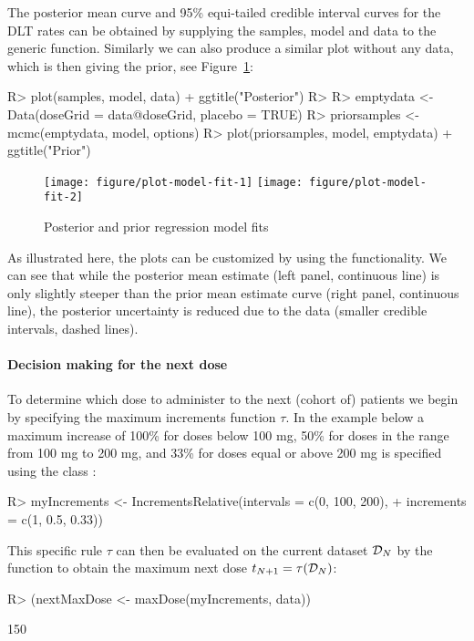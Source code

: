 \documentclass[article]{jss}\usepackage[]{graphicx}\usepackage[]{color}
\begin{document}
The posterior mean curve and 95\% equi-tailed credible interval curves for the 
DLT rates can be obtained by supplying
the samples, model and data to the generic  function. Similarly we can 
also produce a similar plot without any data, which is then giving the prior, see Figure~\ref{fig:plot-model-fit}:

\begin{Schunk}
\begin{Sinput}
R> plot(samples, model, data) + ggtitle("Posterior")
R> 
R> emptydata <- Data(doseGrid = data@doseGrid, placebo = TRUE)
R> priorsamples <- mcmc(emptydata, model, options)
R> plot(priorsamples, model, emptydata) + ggtitle("Prior")
\end{Sinput}
\begin{figure}

{\centering \texttt{[image: figure/plot-model-fit-1]} \texttt{[image: figure/plot-model-fit-2]} 

}

\caption[Posterior and prior regression model fits]{Posterior and prior regression model fits}\label{fig:plot-model-fit}
\end{figure}
\end{Schunk}
As illustrated here, the plots can be customized by using the  \citep{ggplot2}
functionality. We can see that while the posterior mean estimate (left panel, continuous line)
is only slightly steeper than the prior mean estimate curve (right panel, continuous line),
the posterior uncertainty is reduced due to the data (smaller credible intervals, dashed lines). 

\paragraph{Decision making for the next dose}
To determine which dose to administer to the next (cohort of) patients we begin by 
specifying the maximum increments function $\tau$. In the example below a maximum increase of 100\%
for doses below 100 mg, 50\% for doses in the range from 100 mg to 200 mg, and 33\% 
for doses equal or above 200 mg is specified using the class :
\begin{Schunk}
\begin{Sinput}
R> myIncrements <- IncrementsRelative(intervals = c(0, 100, 200), 
+                                     increments = c(1, 0.5, 0.33))
\end{Sinput}
\end{Schunk}
This specific rule $\tau$ can then be evaluated on the current dataset ${\cal D}_{N}$ by 
the  function to obtain the maximum next dose $t_{N+1} = \tau({\cal D}_{N})$:
\begin{Schunk}
\begin{Sinput}
R> (nextMaxDose <- maxDose(myIncrements, data))
\end{Sinput}
\begin{Soutput}
[1] 150
\end{Soutput}
\end{Schunk}
\end{document}
